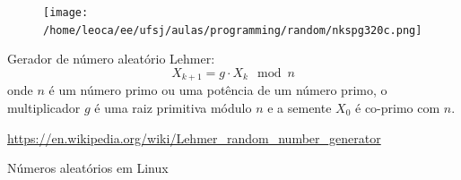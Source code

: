\begin{frame}
  \framebreak
  \begin{figure}[h!]
  \centering
  \texttt{[image: /home/leoca/ee/ufsj/aulas/programming/random/nkspg320c.png]}
  \label{fig:nkspg320c}
  \end{figure}


  \framebreak
  

  \framebreak
  Gerador de número aleatório Lehmer:
  \begin{equation}
  X_{k+1} = g \cdot X_k \mod n
  \end{equation}
  onde $n$ é um número primo ou uma potência de um número primo,
  o multiplicador $g$ é uma raiz primitiva módulo $n$ e a semente
  $X_0$ é co-primo com $n$.

  \url{https://en.wikipedia.org/wiki/Lehmer_random_number_generator}

  \framebreak
  

  \framebreak
  Números aleatórios em Linux

  

\end{frame}








